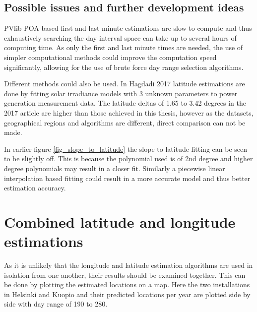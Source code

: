 \subsection{Possible issues and further development ideas}
PVlib POA based first and last minute estimations are slow to compute and thus exhaustively searching the day interval space can take up to several hours of computing time. As only the first and last minute times are needed, the use of simpler computational methods could improve the computation speed significantly, allowing for the use of brute force day range selection algorithms.

Different methods could also be used. In Hagdadi 2017 \cite{navid_australian_article} latitude estimations are done by fitting solar irradiance models with 3 unknown parameters to power generation measurement data. The latitude deltas of 1.65 to 3.42 degrees in the 2017 article are higher than those achieved in this thesis, however as the datasets, geographical regions and algorithms are different, direct comparison can not be made.


In earlier figure \ref{fig_slope_to_latitude} the slope to latitude fitting can be seen to be slightly off. This is because the polynomial used is of 2nd degree and higher degree polynomials may result in a closer fit. Similarly a piecewise linear interpolation based fitting could result in a more accurate model and thus better estimation accuracy.


\newpage
\section{Combined latitude and longitude estimations}
As it is unlikely that the longitude and latitude estimation algorithms are used in isolation from one another, their results should be examined together. This can be done by plotting the estimated locations on a map. Here the two installations in Helsinki and Kuopio and their predicted locations per year are plotted side by side with day range of 190 to 280.

